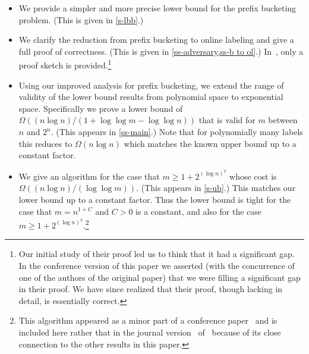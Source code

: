 \documentclass[unicode,review]{siamart1116}
\numberwithin{theorem}{section}
\begin{document}
\begin{itemize}
\item We provide a simpler and more precise lower bound for the prefix bucketing problem. (This is given in \cref{s-lbb}.)
\item We clarify the reduction  from prefix bucketing to online labeling and give a full proof of correctness.
(This is given in \cref{ss-adversary,ss-b to ol}.)
In~\cite{DSZ04}, only a proof sketch is provided.\footnote{Our initial study
of their proof led us to think that it had a significant gap. In the conference
version of this paper we asserted (with the concurrence of one of the authors of
the original paper) that we were filling a significant gap in their proof.  We  have since realized that
their proof, though lacking in detail, is essentially  correct.}
\item Using our improved analysis for prefix bucketing, we extend the range of validity of the
lower bound results from polynomial space to exponential space.  Specifically we prove a lower bound of
$\Omega((n \log n) / (1+\log \log m - \log \log n))$ that is valid
for $m$ between $n$ and $2^{n}$. (This appears in \cref{ss-main}.)
Note that for polynomially many labels this reduces to $\Omega(n \log n)$ which matches the
known upper bound up to a constant factor.
\item We give an algorithm for the case that  
$m \geq 1+2^{(\log n)^{3}}$ 
whose cost is  $\Omega((n \log n) / (\log \log m))$.  (This appears in \cref{s-ub}.)
This
matches our lower bound up to a constant factor.  Thus the lower bound
is tight for the case that $m=n^{1+C}$ and $C>0$ is a constant, and
also for the case $m \geq 1+2^{(\log n)^3}$.\footnote{This algorithm appeared  as a minor part of a conference
paper~\cite{BKS} and is included here rather that in the journal version~\cite{BKSa} of~\cite{BKS} because
of its close connection  to the other results in this paper.}
\end{itemize}


\iffalse
Our initial study of their proof of the reduction from prefix bucketing to online
labeling \cite{DSZ04} led us to think that there is a significant gap in the proof.
We modified their proof and obtained a correct version of the reduction.
In the conference version of the present paper,
we claimed that we were correcting an apparently significant gap in the previous proof;
we made this claim after checking with one of the authors who agreed with it.
Having now done a more careful comparison of our proof to theirs,
we see that while the proof in \cite{DSZ04} has some misleading statements and missing details,
it is essentially correct.
We present the details of our modification in order to clarify the ambiguities that were present in \cite{DSZ04}.
\fi
\end{document}
